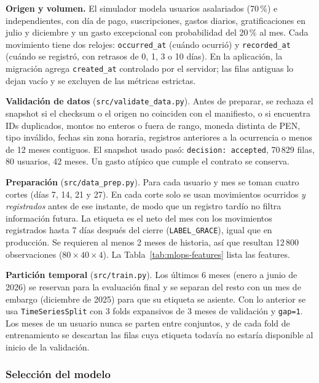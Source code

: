 \textbf{Origen y volumen.} El simulador modela usuarios asalariados (70\,\%) e independientes, con día de pago, suscripciones, gastos diarios, gratificaciones en julio y diciembre y un gasto excepcional con probabilidad del 20\,\% al mes. Cada movimiento tiene dos relojes: \texttt{occurred\_at} (cuándo ocurrió) y \texttt{recorded\_at} (cuándo se registró, con retrasos de 0, 1, 3 o 10 días). En la aplicación, la migración agrega \texttt{created\_at} controlado por el servidor; las filas antiguas lo dejan vacío y se excluyen de las métricas estrictas.

\textbf{Validación de datos} (\texttt{src/validate\_data.py}). Antes de preparar, se rechaza el snapshot si el checksum o el origen no coinciden con el manifiesto, o si encuentra IDs duplicados, montos no enteros o fuera de rango, moneda distinta de PEN, tipo inválido, fechas sin zona horaria, registros anteriores a la ocurrencia o menos de 12 meses contiguos. El snapshot usado pasó: \texttt{decision: accepted}, 70\,829 filas, 80 usuarios, 42 meses. Un gasto atípico que cumple el contrato se conserva.

\textbf{Preparación} (\texttt{src/data\_prep.py}). Para cada usuario y mes se toman cuatro cortes (días 7, 14, 21 y 27). En cada corte solo se usan movimientos ocurridos \emph{y registrados} antes de ese instante, de modo que un registro tardío no filtra información futura. La etiqueta es el neto del mes con los movimientos registrados hasta 7 días después del cierre (\texttt{LABEL\_GRACE}), igual que en producción. Se requieren al menos 2 meses de historia, así que resultan 12\,800 observaciones ($80 \times 40 \times 4$). La Tabla~\ref{tab:mlops-features} lista las features.



\textbf{Partición temporal} (\texttt{src/train.py}). Los últimos 6 meses (enero a junio de 2026) se reservan para la evaluación final y se separan del resto con un mes de embargo (diciembre de 2025) para que su etiqueta se asiente. Con lo anterior se usa \texttt{TimeSeriesSplit} con 3 folds expansivos de 3 meses de validación y \texttt{gap=1}. Los meses de un usuario nunca se parten entre conjuntos, y de cada fold de entrenamiento se descartan las filas cuya etiqueta todavía no estaría disponible al inicio de la validación.

\subsubsection{Selección del modelo}

